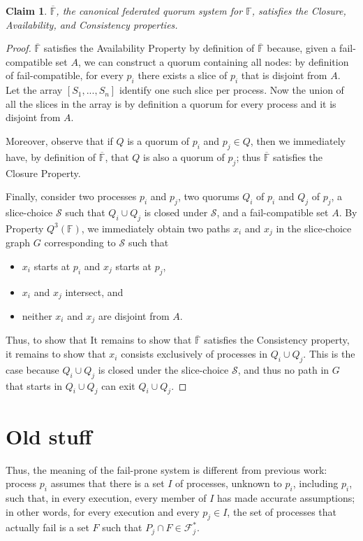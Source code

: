 \documentclass[11pt]{article}
\newtheorem{claim}{Claim}
\begin{document}
\begin{claim}
 $\overline{\mathbb{F}}$, the canonical federated quorum system for $\mathbb{F}$, satisfies the Closure, Availability, and Consistency properties.
\end{claim}
\begin{proof}
  $\overline{\mathbb{F}}$ satisfies the Availability Property by definition of $\overline{\mathbb{F}}$ because, given a fail-compatible set $A$, we can construct a quorum containing all nodes: by definition of fail-compatible, for every $p_i$ there exists a slice of $p_i$ that is disjoint from $A$. Let the array $\left[S_1,...,S_n\right]$ identify one such slice per process. Now the union of all the slices in the array is by definition a quorum for every process and it is disjoint from $A$.

  Moreover, observe that if $Q$ is a quorum of $p_i$ and $p_j\in Q$, then we immediately have, by definition of $\overline{\mathbb{F}}$, that $Q$ is also a quorum of $p_j$; thus $\overline{\mathbb{F}}$ satisfies the Closure Property.

  Finally, consider two processes $p_i$ and $p_j$, two quorums $Q_i$ of $p_i$ and $Q_j$ of $p_j$, a slice-choice $\mathcal{S}$ such that $Q_i\cup Q_j$ is closed under $\mathcal{S}$, and a fail-compatible set $A$. By Property $Q^3(\mathbb{F})$, we immediately obtain two paths $x_i$ and $x_j$ in the slice-choice graph $G$ corresponding to $\mathcal{S}$ such that
    \begin{itemize}
      \item $x_i$ starts at $p_i$ and $x_j$ starts at $p_j$,
      \item $x_i$ and $x_j$ intersect, and
      \item neither $x_i$ and $x_j$ are disjoint from $A$.
    \end{itemize}
    Thus, to show that It remains to show that $\overline{\mathbb{F}}$ satisfies the Consistency property, it remains to show that $x_i$ consists exclusively of processes in $Q_i\cup Q_j$. This is the case because $Q_i\cup Q_j$ is closed under the slice-choice $\mathcal{S}$, and thus no path in $G$ that starts in $Q_i\cup Q_j$ can exit $Q_i\cup Q_j$.
\end{proof}

\section{Old stuff}


Thus, the meaning of the fail-prone system is different from previous work: process $p_i$ assumes that there is a set $I$ of processes, unknown to $p_i$, including $p_i$, such that, in every execution, every member of $I$ has made accurate assumptions; in other words, for every execution and every $p_j\in I$, the set of processes that actually fail is a set $F$ such that $P_j\cap F \in \mathcal{F}_j^*$.
\end{document}
